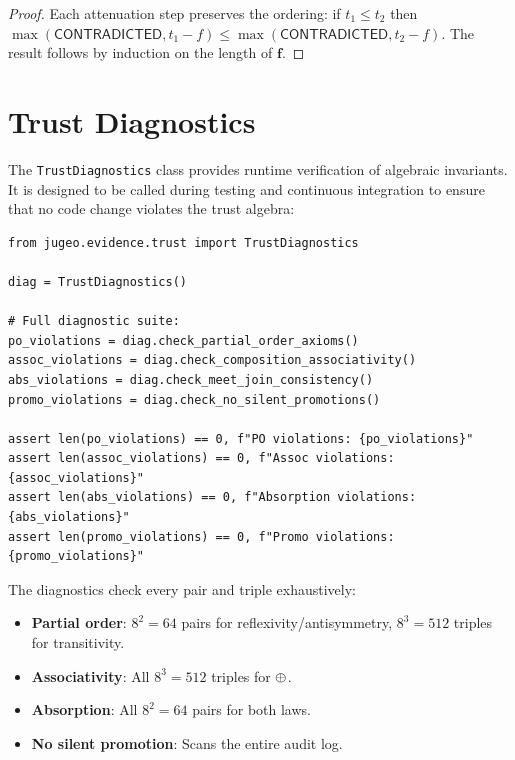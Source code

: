 \documentclass[11pt]{article}
\newcommand{\Contra}{\mathsf{CONTRADICTED}}
\begin{document}
\begin{proof}
Each attenuation step preserves the ordering: if $t_1 \leq t_2$ then
$\max(\Contra, t_1 - f) \leq \max(\Contra, t_2 - f)$.  The result follows by
induction on the length of $\mathbf{f}$.
\end{proof}

\section{Trust Diagnostics}\label{sec:diagnostics}

The \texttt{TrustDiagnostics} class provides runtime verification of algebraic
invariants.  It is designed to be called during testing and continuous
integration to ensure that no code change violates the trust algebra:

\begin{lstlisting}[style=jugeo-python]
from jugeo.evidence.trust import TrustDiagnostics

diag = TrustDiagnostics()

# Full diagnostic suite:
po_violations = diag.check_partial_order_axioms()
assoc_violations = diag.check_composition_associativity()
abs_violations = diag.check_meet_join_consistency()
promo_violations = diag.check_no_silent_promotions()

assert len(po_violations) == 0, f"PO violations: {po_violations}"
assert len(assoc_violations) == 0, f"Assoc violations: {assoc_violations}"
assert len(abs_violations) == 0, f"Absorption violations: {abs_violations}"
assert len(promo_violations) == 0, f"Promo violations: {promo_violations}"
\end{lstlisting}

The diagnostics check every pair and triple exhaustively:
\begin{itemize}[leftmargin=2em]
  \item \textbf{Partial order}: $8^2 = 64$ pairs for reflexivity/antisymmetry,
        $8^3 = 512$ triples for transitivity.
  \item \textbf{Associativity}: All $8^3 = 512$ triples for $\oplus$.
  \item \textbf{Absorption}: All $8^2 = 64$ pairs for both laws.
  \item \textbf{No silent promotion}: Scans the entire audit log.
\end{itemize}
\end{document}

